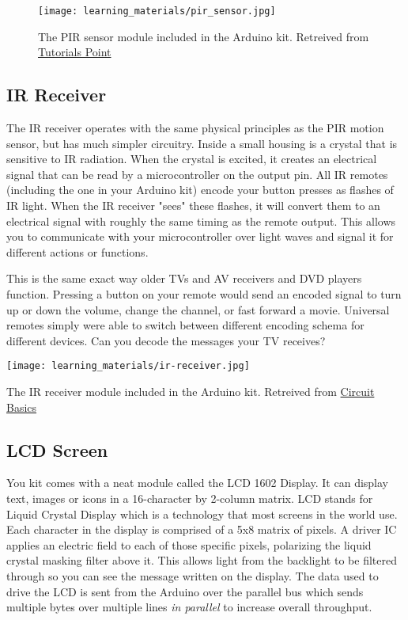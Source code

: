     \begin{figure}[h!]
        \texttt{[image: learning\_materials/pir\_sensor.jpg]}
        \caption[PIR Sensor]{The PIR sensor module included in the Arduino kit. 
        Retreived from \href{https://www.tutorialspoint.com/arduino/arduino_pir_sensor.htm}
        {Tutorials Point}}
    \end{figure}

    \subsection*{IR Receiver}
    The IR receiver operates with the same physical principles as the PIR motion sensor, but has much simpler circuitry.
    Inside a small housing is a crystal that is sensitive to IR radiation.
    When the crystal is excited, it creates an electrical signal that can be read by a microcontroller on the output pin.
    All IR remotes (including the one in your Arduino kit) encode your button presses as flashes of IR light.
    When the IR receiver "sees" these flashes, it will convert them to an electrical signal with roughly the same timing as the remote output.
    This allows you to communicate with your microcontroller over light waves and signal it for different actions or functions.

    This is the same exact way older TVs and AV receivers and DVD players function. 
    Pressing a button on your remote would send an encoded signal to turn up or down the volume, change the channel, or fast forward a movie.
    Universal remotes simply were able to switch between different encoding schema for different devices.
    Can you decode the messages your TV receives?

    \begin{marginfigure}[-2.5in]
        \texttt{[image: learning\_materials/ir-receiver.jpg]}
        \caption[IR Receiver]{The IR receiver module included in the Arduino kit. 
        Retreived from \href{https://www.circuitbasics.com/arduino-ir-remote-receiver-tutorial/}
        {Circuit Basics}}
    \end{marginfigure}

    \subsection*{LCD Screen}
    You kit comes with a neat module called the LCD 1602 Display.
    It can display text, images or icons in a 16-character by 2-column matrix.
    LCD stands for Liquid Crystal Display which is a technology that most screens in the world use. 
    Each character in the display is comprised of a 5x8 matrix of pixels.
    A driver IC applies an electric field to each of those specific pixels, polarizing the liquid crystal masking filter above it.
    This allows light from the backlight to be filtered through so you can see the message written on the display.
    The data used to drive the LCD is sent from the Arduino over the parallel bus which sends multiple bytes over multiple lines \textit{in parallel} to increase overall throughput.


